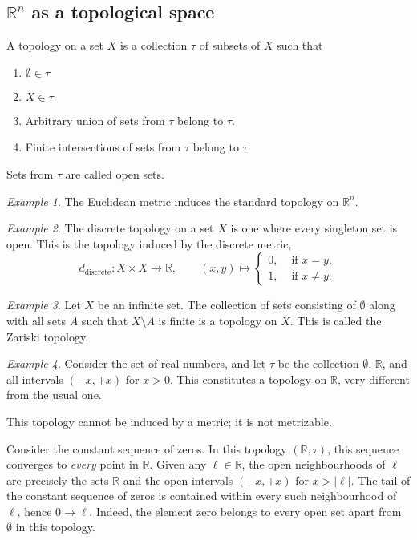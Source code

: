 \documentclass[11pt]{article}
\newcommand{\R}{\mathbb{R}}
\theoremstyle{definition}
\theoremstyle{remark}
\newtheorem*{example}{Example}
\numberwithin{equation}{section}
\begin{document}
    \subsection{$\R^n$ as a topological space}
    \begin{definition}
        A topology on a set $X$ is a collection $\tau$ of subsets of $X$ such that
        \begin{enumerate}
            \itemsep0em
            \item $\emptyset \in \tau$
            \item $X \in \tau$
            \item Arbitrary union of sets from $\tau$ belong to $\tau$.
            \item Finite intersections of sets from $\tau$ belong to $\tau$.
        \end{enumerate}
        Sets from $\tau$ are called open sets.
    \end{definition}
    \begin{example}
        The Euclidean metric induces the standard topology on $\R^n$.
    \end{example}
    \begin{example}
        The discrete topology on a set $X$ is one where every singleton set is open.
        This is the topology induced by the discrete metric, \[
            d_\text{discrete}\colon X\times X \to \R, \qquad
            (x, y) \mapsto \begin{cases}
                0, &\text{ if }x = y, \\
                1, &\text{ if }x \neq y.
            \end{cases}
        \] 
    \end{example}
    \begin{example}
        Let $X$ be an infinite set. The collection of sets consisting of $\emptyset$
        along with all sets $A$ such that $X\setminus A$ is finite is a topology on
        $X$. This is called the Zariski topology.
    \end{example}
    \begin{example}
        Consider the set of real numbers, and let $\tau$ be the collection
        $\emptyset$, $\R$, and all intervals $(-x, +x)$ for $x > 0$. This constitutes
        a topology on $\R$, very different from the usual one.

        This topology cannot be induced by a metric; it is not metrizable.

        Consider the constant sequence of zeros. In this topology $(\R, \tau)$, this
        sequence converges to \emph{every} point in $\R$. Given any $\ell \in \R$, the
        open neighbourhoods of $\ell$ are precisely the sets $\R$ and the open intervals
        $(-x, +x)$ for $x > |\ell|$. The tail of the constant sequence of zeros is
        contained within every such neighbourhood of $\ell$, hence $0 \to \ell$.
        Indeed, the element zero belongs to every open set apart from $\emptyset$ in
        this topology.
    \end{example}
\end{document}
